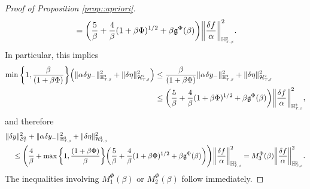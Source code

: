 \documentclass[10pt]{article} %
\newcommand\cH{\mathcal H}
\newcommand\cS{\mathcal S}
\newcommand{\smalltext}[1]{\text{\fontsize{4}{4}\selectfont$#1$}}
\newcommand\fg{\mathfrak g}
\def \H{\mathbb{H}}
\newcommand{\1}{\mathbf{1}}
\begin{document}
\begin{proof}[Proof of Proposition \ref{prop::apriori}]
\begin{align*}
	&\quad= \bigg( \frac{5}{\beta} + \frac{4}{\beta}(1+\beta\Phi)^{1/2} + \beta \fg^\Phi(\beta) \bigg)\bigg\|\frac{\delta f}{\alpha}\bigg\|^2_{\H^\smalltext{2}_{\smalltext{T}\smalltext{,}\smalltext{\beta}}}.
\end{align*}
In particular, this implies
\begin{align*}
	\min\bigg\{1,\frac{\beta}{(1+\beta\Phi)}\bigg\}\Big(\|\alpha\delta y_{-}\|^2_{\H^\smalltext{2}_{\smalltext{T}\smalltext{,}\smalltext{\beta}}} + \|\delta\eta\|^2_{\cH^\smalltext{2}_{\smalltext{T}\smalltext{,}\smalltext{\beta}}}\Big)
	&\leq \frac{\beta}{(1+\beta\Phi)}\|\alpha\delta y_{-}\|^2_{\H^\smalltext{2}_{\smalltext{T}\smalltext{,}\smalltext{\beta}}} + \|\delta\eta\|^2_{\cH^\smalltext{2}_{\smalltext{T}\smalltext{,}\smalltext{\beta}}} \\
	&\leq \bigg(\frac{5}{\beta} +\frac{4}{\beta}(1+\beta\Phi)^{1/2} + \beta \fg^\Phi(\beta)\bigg)\bigg\|\frac{\delta f}{\alpha}\bigg\|^2_{\H^\smalltext{2}_{\smalltext{T}\smalltext{,}\smalltext{\beta}}},
\end{align*}
and therefore
\begin{align*}
	&\|\delta y\|^2_{\cS^\smalltext{2}_\smalltext{T}} + \|\alpha\delta y_{-}\|^2_{\H^\smalltext{2}_{\smalltext{T}\smalltext{,}\smalltext{\beta}}} + \|\delta\eta\|^2_{\cH^\smalltext{2}_{\smalltext{T}\smalltext{,}\smalltext{\beta}}} \\ 
	&\quad\leq \Bigg(\frac{4}{\beta} + \max\bigg\{1,\frac{(1+\beta\Phi)}{\beta}\bigg\}\bigg(\frac{5}{\beta} +\frac{4}{\beta}(1+\beta\Phi)^{1/2} + \beta \fg^\Phi(\beta)\bigg)\Bigg)\bigg\|\frac{\delta f}{\alpha}\bigg\|^2_{\H^\smalltext{2}_{\smalltext{T}\smalltext{,}\smalltext{\beta}}} 
	= M^\Phi_3(\beta)\bigg\|\frac{\delta f}{\alpha}\bigg\|^2_{\H^\smalltext{2}_{\smalltext{T}\smalltext{,}\smalltext{\beta}}}.
\end{align*}
The inequalities involving $M^\Phi_1(\beta)$ or $M^\Phi_2(\beta)$ follow immediately.



\end{proof}
\end{document}
